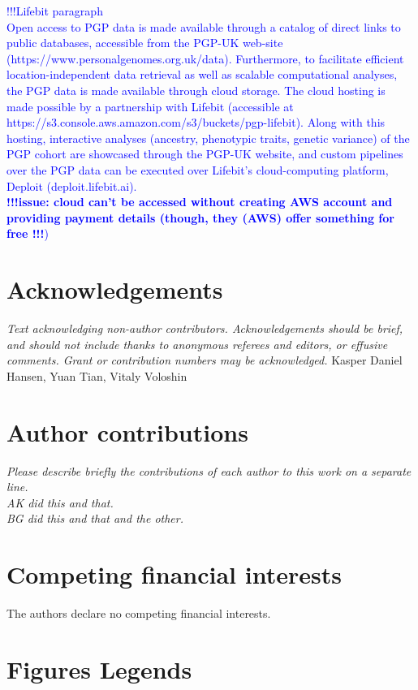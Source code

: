 \documentclass[english]{article}
\begin{document}
\textcolor{blue}{!!!Lifebit paragraph\\
Open access to PGP data is made available through a catalog of direct links to public databases, accessible from the PGP-UK web-site\\ (https://www.personalgenomes.org.uk/data). Furthermore, to facilitate efficient location-independent data retrieval as well as scalable computational analyses, the PGP data is made available through cloud storage. The cloud hosting is made possible by a partnership with Lifebit (accessible at https://s3.console.aws.amazon.com/s3/buckets/pgp-lifebit). Along with this hosting, interactive analyses (ancestry, phenotypic traits, genetic variance) of the PGP cohort are showcased through the PGP-UK website, and custom pipelines over the PGP data can be executed over Lifebit’s cloud-computing platform, Deploit (deploit.lifebit.ai).\\
\textbf{!!!issue: cloud can't be accessed without creating AWS account and providing payment details (though, they (AWS) offer something for free !!!})
}

\section*{Acknowledgements}

\textit{Text acknowledging non-author contributors. Acknowledgements should
be brief, and should not include thanks to anonymous referees and
editors, or effusive comments. Grant or contribution numbers may be
acknowledged.}  Kasper Daniel Hansen, Yuan Tian, Vitaly Voloshin

\section*{Author contributions}
\textit{Please describe briefly the contributions
of each author to this work on a separate line. 
\\
AK did this and that. 
\\
BG did this and that and the other.}


\section*{Competing financial interests}

The authors declare no competing financial interests.


\section*{Figures Legends}
\end{document}
